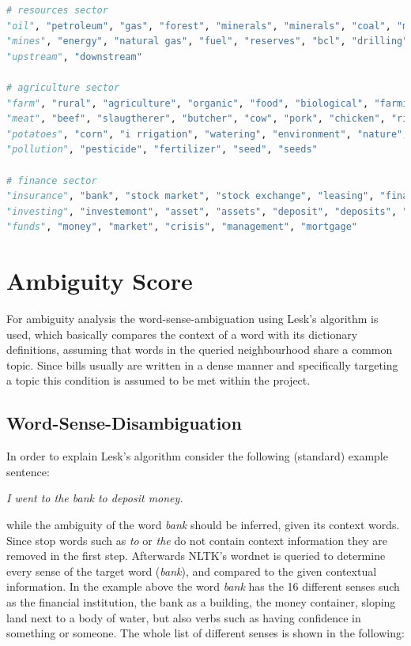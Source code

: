 \documentclass{custom_report}
\begin{document}
\begin{lstlisting}[language=Python, caption=Predefined set of keywords by industry sector, captionpos=b, basicstyle=\small]
# resources sector
"oil", "petroleum", "gas", "forest", "minerals", "minerals", "coal", "mining",
"mines", "energy", "natural gas", "fuel", "reserves", "bcl", "drilling",
"upstream", "downstream"

# agriculture sector
"farm", "rural", "agriculture", "organic", "food", "biological", "farming",
"meat", "beef", "slaugtherer", "butcher", "cow", "pork", "chicken", "rind",
"potatoes", "corn", "i rrigation", "watering", "environment", "nature",
"pollution", "pesticide", "fertilizer", "seed", "seeds"

# finance sector
"insurance", "bank", "stock market", "stock exchange", "leasing", "finance",
"investing", "investemont", "asset", "assets", "deposit", "deposits", "fund",
"funds", "money", "market", "crisis", "management", "mortgage"
\end{lstlisting}

\section{Ambiguity Score}
For ambiguity analysis the word-sense-ambiguation using Lesk's algorithm \cite{lesk} is used, which basically compares the context of a word with its dictionary definitions, assuming that words in the queried neighbourhood share a common topic. Since bills usually are written in a dense manner and specifically targeting a topic this condition is assumed to be met within the project.

\subsection{Word-Sense-Disambiguation}
In order to explain Lesk's algorithm consider the following (standard) example sentence:

\vspace*{0.5cm}
\begin{center}
\textit{I went to the bank to deposit money.}
\end{center}
\vspace*{0.5cm}

while the ambiguity of the word \textit{bank} should be inferred, given its context words. Since stop words such as \textit{to} or \textit{the} do not contain context information they are removed in the first step. Afterwards NLTK's wordnet \cite{wordnet} is queried to determine every sense of the target word (\textit{bank}), and compared to the given contextual information. In the example above the word \textit{bank} has the 16 different senses such as the financial institution, the bank as a building, the money container, sloping land next to a body of water, but also verbs such as having confidence in something or someone. The whole list of different senses is shown in the following: 
\end{document}
